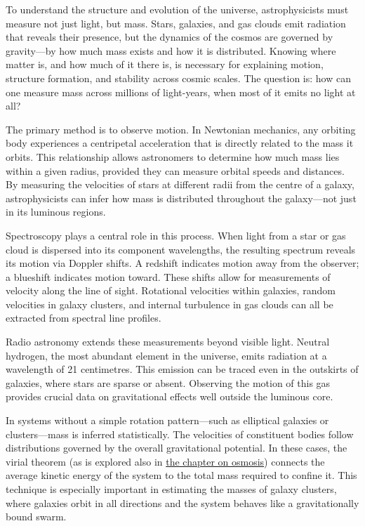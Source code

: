 To understand the structure and evolution of the universe, astrophysicists must measure not just light, but mass. Stars, galaxies, and gas clouds emit radiation that reveals their presence, but the dynamics of the cosmos are governed by gravity—by how much mass exists and how it is distributed. Knowing where matter is, and how much of it there is, is necessary for explaining motion, structure formation, and stability across cosmic scales. The question is: how can one measure mass across millions of light-years, when most of it emits no light at all?

The primary method is to observe motion. In Newtonian mechanics, any orbiting body experiences a centripetal acceleration that is directly related to the mass it orbits. This relationship allows astronomers to determine how much mass lies within a given radius, provided they can measure orbital speeds and distances. By measuring the velocities of stars at different radii from the centre of a galaxy, astrophysicists can infer how mass is distributed throughout the galaxy—not just in its luminous regions.

Spectroscopy plays a central role in this process. When light from a star or gas cloud is dispersed into its component wavelengths, the resulting spectrum reveals its motion via Doppler shifts. A redshift indicates motion away from the observer; a blueshift indicates motion toward. These shifts allow for measurements of velocity along the line of sight. Rotational velocities within galaxies, random velocities in galaxy clusters, and internal turbulence in gas clouds can all be extracted from spectral line profiles.

Radio astronomy extends these measurements beyond visible light. Neutral hydrogen, the most abundant element in the universe, emits radiation at a wavelength of 21 centimetres. This emission can be traced even in the outskirts of galaxies, where stars are sparse or absent. Observing the motion of this gas provides crucial data on gravitational effects well outside the luminous core.

In systems without a simple rotation pattern—such as elliptical galaxies or clusters—mass is inferred statistically. The velocities of constituent bodies follow distributions governed by the overall gravitational potential. In these cases, the virial theorem (as is explored also in \hyperref[ch:osmosisdebye]{the chapter on osmosis}) connects the average kinetic energy of the system to the total mass required to confine it. This technique is especially important in estimating the masses of galaxy clusters, where galaxies orbit in all directions and the system behaves like a gravitationally bound swarm.

